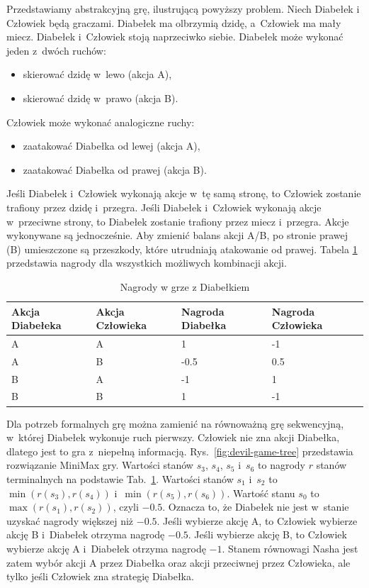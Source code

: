 Przedstawiamy abstrakcyjną grę, ilustrującą powyższy problem.
Niech Diabełek i Człowiek będą graczami.
Diabełek ma olbrzymią dzidę, a~Człowiek ma mały miecz.
Diabełek i~Człowiek stoją naprzeciwko siebie.
Diabełek może wykonać jeden z~dwóch ruchów:
\begin{itemize}
    \item skierować dzidę w~lewo (akcja A),
    \item skierować dzidę w~prawo (akcja B).
\end{itemize}
Człowiek może wykonać analogiczne ruchy:
\begin{itemize}
    \item zaatakować Diabełka od lewej (akcja A),
    \item zaatakować Diabełka od prawej (akcja B).
\end{itemize}
Jeśli Diabełek i~Człowiek wykonają akcje w~tę samą stronę,
to Człowiek zostanie trafiony przez dzidę i~przegra.
Jeśli Diabełek i~Człowiek wykonają akcje w~przeciwne strony,
to Diabełek zostanie trafiony przez miecz i~przegra.
Akcje wykonywane są jednocześnie.
Aby zmienić balans akcji A/B, po stronie prawej (B)
umieszczone są przeszkody, które utrudniają atakowanie od prawej.
Tabela \ref{tab:devil-game-rewards} przedstawia nagrody
dla wszystkich możliwych kombinacji akcji.

\begin{table}
    \centering
    \caption{Nagrody w grze z Diabełkiem}
    \label{tab:devil-game-rewards}
    \begin{tabular}{llll}
        \toprule
        Akcja Diabełeka & Akcja Człowieka & Nagroda Diabełka & Nagroda Człowieka \\ \midrule
        A               & A               & 1                & -1                \\
        A               & B               & -0.5             & 0.5               \\
        B               & A               & -1               & 1                 \\
        B               & B               & 1                & -1                \\
        \bottomrule
    \end{tabular}
\end{table}


Dla potrzeb formalnych grę można zamienić na równoważną grę
sekwencyjną, w~której Diabełek wykonuje ruch pierwszy.
Człowiek nie zna akcji Diabełka, dlatego
jest to gra z~niepełną informacją.
Rys.~\ref{fig:devil-game-tree} przedstawia rozwiązanie MiniMax gry.
Wartości stanów $s_3$, $s_4$, $s_5$ i~$s_6$ to nagrody $r$
stanów terminalnych na podstawie Tab.~\ref{tab:devil-game-rewards}.
Wartości stanów $s_1$ i~$s_2$ to $\min(r(s_3), r(s_4))$ i~$\min(r(s_5), r(s_6))$.
Wartość stanu $s_0$ to $\max(r(s_1), r(s_2))$, czyli $-0.5$.
Oznacza to, że Diabełek nie jest w~stanie uzyskać nagrody większej niż $-0.5$.
Jeśli wybierze akcję A, to Człowiek wybierze akcję B i~Diabełek otrzyma nagrodę $-0.5$.
Jeśli wybierze akcję B, to Człowiek wybierze akcję A i~Diabełek otrzyma nagrodę $-1$.
Stanem równowagi Nasha jest zatem wybór akcji A przez Diabełka
oraz akcji przeciwnej przez Człowieka, ale tylko jeśli Człowiek
zna strategię Diabełka.

